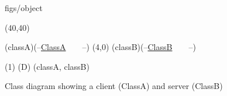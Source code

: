 





\begin {figure}


\Draw

 {figs/object}

\MinNodeSize(40,40)

\RectNode (classA)(--\underline {ClassA}~~~~--)
\MoveToExit(4,0)
\RectNode (classB)(--\underline {ClassB}~~~~--)

\ArrowHeads(1)
\EdgeSpec (D)
\Edge(classA, classB)

\EndDraw

\caption {Class diagram showing a client (ClassA) and server
	(ClassB) }


\label {fig:clientServerAB}

\end {figure}


